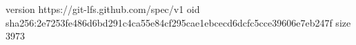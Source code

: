 version https://git-lfs.github.com/spec/v1
oid sha256:2e7253fe486d6bd291c4ca55e84cf295cae1ebcecd6dcfc5cce39606e7eb247f
size 3973
